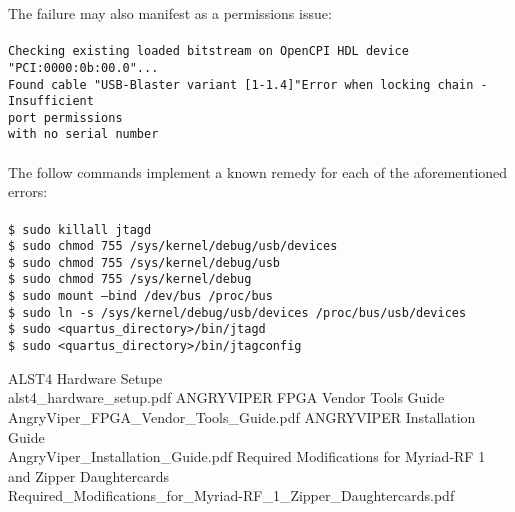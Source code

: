 \documentclass{article}
\newcommand{\terminaloutput}[1]{\texttt{#1}}
\begin{document}
The failure may also manifest as a permissions issue: \\ \\
\noindent\terminaloutput{Checking existing loaded bitstream on OpenCPI HDL device "PCI:0000:0b:00.0"... \\
Found cable "USB-Blaster variant [1-1.4]"Error when locking chain - Insufficient \\
 port permissions \\
 with no serial number \\
\\
}
The follow commands implement a known remedy for each of the aforementioned errors: \\ \\
\noindent\terminaloutput{\$ sudo killall jtagd \\
\$ sudo chmod 755 /sys/kernel/debug/usb/devices \\
\$ sudo chmod 755 /sys/kernel/debug/usb \\
\$ sudo chmod 755 /sys/kernel/debug \\
\$ sudo mount --bind /dev/bus /proc/bus \\
\$ sudo ln -s /sys/kernel/debug/usb/devices /proc/bus/usb/devices \\
\$ sudo <quartus\_directory>/bin/jtagd \\
\$ sudo <quartus\_directory>/bin/jtagconfig}

\pagebreak
  \begin{thebibliography}{1}


   ALST4 Hardware Setupe\\
	 alst4\_hardware\_setup.pdf
   ANGRYVIPER FPGA Vendor Tools Guide\\
	 AngryViper\_FPGA\_Vendor\_Tools\_Guide.pdf
	    ANGRYVIPER Installation Guide\\
	 AngryViper\_Installation\_Guide.pdf
	    Required Modifications for Myriad-RF 1 and Zipper Daughtercards\\
	 Required\_Modifications\_for\_Myriad-RF\_1\_Zipper\_Daughtercards.pdf

  \end{thebibliography}
\end{document}

